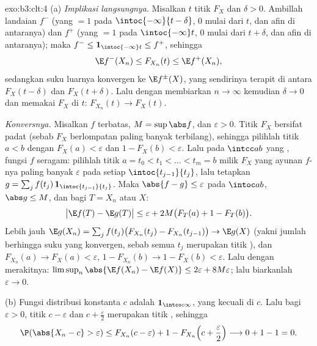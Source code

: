 \begin{solution}{exo:b3:clt:4}
(a) \emph{Implikasi langsungnya.} Misalkan $t$ titik 
$F_X$ dan $\delta > 0$. Ambillah landaian 
$f^-$ (yang $= 1$ pada $\intoc{-\infty}{t-\delta}$, $0$ mulai dari $t$,
dan afin di antaranya) dan $f^+$ (yang $= 1$ pada $\intoc{-\infty}t$,
$0$ mulai dari $t + \delta$, dan afin di antaranya); maka $f^- \leq
\mathbf 1_{\intoc{-\infty}t} \leq f^+$, sehingga
\[
\E f^-(X_n) \leq F_{X_n}(t) \leq \E f^+(X_n),
\]
sedangkan suku luarnya konvergen ke $\E f^\pm(X)$, yang sendirinya
terapit di antara $F_X(t - \delta)$ dan $F_X(t + \delta)$.
Lalu dengan membiarkan $n \to \infty$ kemudian $\delta \to 0$ dan memakai
 $F_X$ di $t$: $F_{X_n}(t) \to F_X(t)$.

\emph{Konversnya.} Misalkan $f$  terbatas, $M =
\sup\abs f$, dan $\varepsilon > 0$. Titik 
$F_X$ bersifat padat (sebab $F_X$ berlompatan paling banyak terbilang), sehingga
pilihlah titik  $a < b$ dengan $F_X(a) < \varepsilon$
dan $1 - F_X(b) < \varepsilon$. Lalu pada $\intcc ab$ yang ,
fungsi $f$  seragam: pilihlah titik
 $a = t_0 < t_1 < \dots < t_m = b$ milik $F_X$ yang
ayunan $f$-nya paling banyak $\varepsilon$ pada setiap
$\intoc{t_{j-1}}{t_j}$, lalu tetapkan $g = \sum_j
f(t_j)\,\mathbf 1_{\intoc{t_{j-1}}{t_j}}$. Maka $\abs{f - g}
\leq \varepsilon$ pada $\intoc ab$, $\abs g \leq M$, dan bagi
$T = X_n$ atau $X$:
\[
\bigl|\E f(T) - \E g(T)\bigr| \leq \varepsilon +
2M\bigl(F_T(a) + 1 - F_T(b)\bigr).
\]
Lebih jauh $\E g(X_n) = \sum_j f(t_j)\bigl(F_{X_n}(t_j) -
F_{X_n}(t_{j-1})\bigr) \to \E g(X)$ (yakni jumlah berhingga suku
yang konvergen, sebab semua $t_j$ merupakan titik ), dan
$F_{X_n}(a) \to F_X(a) < \varepsilon$, $1 - F_{X_n}(b) \to 1
- F_X(b) < \varepsilon$. Lalu dengan merakitnya:
$\limsup_n\abs{\E f(X_n) - \E f(X)} \leq 2\varepsilon +
8M\varepsilon$; lalu biarkanlah $\varepsilon \to 0$.

(b) Fungsi distribusi konstanta $c$ adalah
$\mathbf 1_{\intco c\infty}$, yang  kecuali di $c$. Lalu bagi
$\varepsilon > 0$, titik $c - \varepsilon$ dan $c +
\frac\varepsilon2$ merupakan titik , sehingga
\[
\P(\abs{X_n - c} > \varepsilon) \leq F_{X_n}(c -
\varepsilon) + 1 - F_{X_n}\Bigl(c + \frac\varepsilon2\Bigr)
\longrightarrow 0 + 1 - 1 = 0 .
\]
\end{solution}

